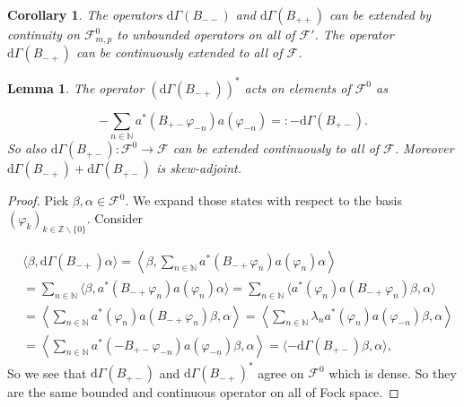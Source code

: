 \documentclass[b5paper,draft,openbib,12pt]{memoir}
\newtheorem{Lemma}[Def]{Lemma}
\newtheorem{Corollary}[Def]{Corollary}
\begin{document}
\begin{Corollary}
The operators \(\mathrm{d}\Gamma(B_{--})\) and \(\mathrm{d}\Gamma(B_{++})\) can be extended by continuity on \(\mathcal{F}^0_{m,p}\) to unbounded operators on all of \(\mathcal{F}'\).
The operator \(\mathrm{d}\Gamma(B_{-+})\) can be continuously extended to all of \(\mathcal{F}\).
\end{Corollary}

\begin{Lemma}
The operator \(\left(\mathrm{d}\Gamma(B_{-+})\right)^*\)  acts on elements of \(\mathcal{F}^0\) as

\begin{equation}
- \sum_{n\in\mathbb{N}} a^*(B_{+-}\varphi_{-n}) a(\varphi_{-n})=:-\mathrm{d}\Gamma(B_{+-}).
\end{equation}
So also \(\mathrm{d}\Gamma(B_{+-}):\mathcal{F}^0\rightarrow \mathcal{F}\) can be extended continuously to all of \(\mathcal{F}\).
Moreover \(\mathrm{d}\Gamma(B_{-+})+\mathrm{d}\Gamma(B_{+-})\) is skew-adjoint.
\end{Lemma}
\begin{proof}
Pick \(\beta,\alpha \in \mathcal{F}^0\). We expand those 
states with respect to the basis 
\((\varphi_k)_{k\in\mathbb{Z}\backslash \{0\}}\). Consider

\begin{align}\nonumber
&\langle \beta, \mathrm{d}\Gamma(B_{-+}) \alpha \rangle=\left\langle \beta, \sum_{n\in\mathbb{N}} a^*(B_{-+}\varphi_n)a(\varphi_{n}) \alpha \right\rangle\\\nonumber
&=\sum_{n\in\mathbb{N}} \langle \beta , a^*(B_{-+}\varphi_n)a(\varphi_{n}) \alpha\rangle
=\sum_{n\in\mathbb{N}}  \langle a^*(\varphi_{n})  a(B_{-+}\varphi_n)\beta , \alpha\rangle\\\nonumber
&=\left\langle \sum_{n\in\mathbb{N}}a^*(\varphi_{n})  a(B_{-+}\varphi_n) \beta, \alpha \right\rangle
=\left\langle \sum_{n\in\mathbb{N}} \lambda_n a^*(\varphi_{n})  a(\varphi_{-n}) \beta, \alpha \right\rangle\\
&=\left\langle \sum_{n\in\mathbb{N}}  a^*(- B_{+-}\varphi_{-n})  a(\varphi_{-n}) \beta, \alpha \right\rangle
=\langle -\mathrm{d}\Gamma(B_{+-})  \beta, \alpha \rangle,
\end{align}
 So we see that \(\mathrm{d}\Gamma(B_{+-})\)
and \(\mathrm{d}\Gamma(B_{-+})^*\) agree on \(\mathcal{F}^0\) which is dense. So they are the same bounded and continuous operator on all of
Fock space. 
\end{proof}
\end{document}
